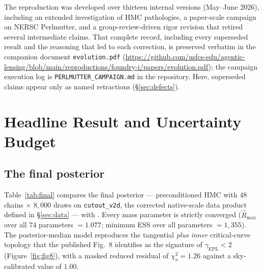 \documentclass[11pt,letterpaper]{article}
\newcommand{\gammaEPL}{\ensuremath{\gamma_{\mathrm{EPL}}}}
\begin{document}
The reproduction was developed over thirteen internal versions
(May--June 2026), including an extended investigation of HMC
pathologies, a paper-scale campaign on NERSC Perlmutter, and a
group-review-driven rigor revision that retired several intermediate
claims. That complete record, including every superseded result and the
reasoning that led to each correction, is preserved verbatim in the
companion document \texttt{evolution.pdf}
(\url{https://github.com/usfcs-edu/agentic-lensing/blob/main/reproductions/foundry-i/papers/evolution.pdf});
the campaign execution log is
\texttt{PERLMUTTER\_CAMPAIGN.md} in the repository. Here, superseded
claims appear only as named retractions (\S\ref{sec:defects}).

\section{Headline Result and Uncertainty Budget}
\label{sec:result}

\subsection{The final posterior}
\label{sec:result-posterior}

Table~\ref{tab:final} compares the final posterior --- preconditioned
HMC with $48$ chains $\times$ $8{,}000$ draws on \texttt{cutout\_v2d},
the corrected native-scale data product defined in \S\ref{sec:data} --- with
\citet[][Table 3]{huang2025foundry1}. Every mass parameter is strictly
converged ($\hat R_{\max}$ over all $74$ parameters $=1.077$; minimum
ESS over all parameters $=1{,}355$). The posterior-median model
reproduces the tangential {\it plus inner} critical-curve topology that
the published Fig.~8 identifies as the signature of $\gammaEPL<2$
(Figure~\ref{fig:fig8}), with a masked reduced residual of
$\chi^{2}_{\nu}=1.26$ against a sky-calibrated value of $1.00$.
\end{document}
